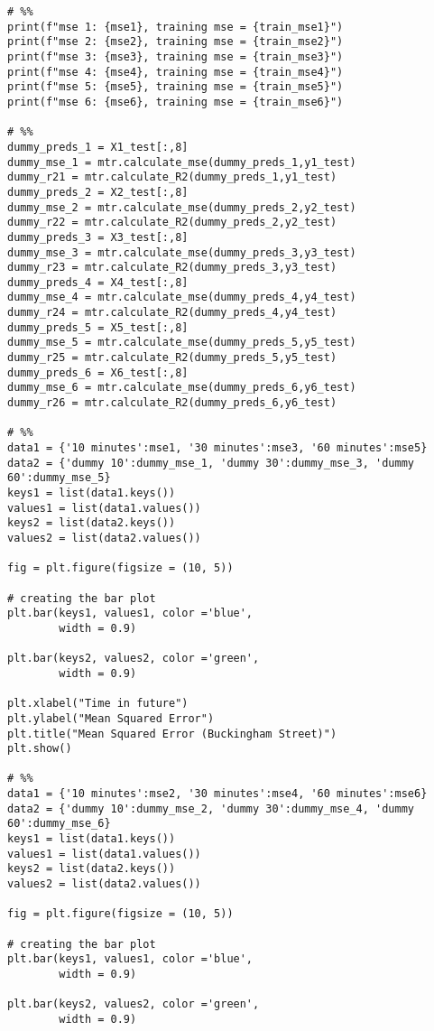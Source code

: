 \begin{verbatim}
# %%
print(f"mse 1: {mse1}, training mse = {train_mse1}")
print(f"mse 2: {mse2}, training mse = {train_mse2}")
print(f"mse 3: {mse3}, training mse = {train_mse3}")
print(f"mse 4: {mse4}, training mse = {train_mse4}")
print(f"mse 5: {mse5}, training mse = {train_mse5}")
print(f"mse 6: {mse6}, training mse = {train_mse6}")

# %%
dummy_preds_1 = X1_test[:,8]
dummy_mse_1 = mtr.calculate_mse(dummy_preds_1,y1_test)
dummy_r21 = mtr.calculate_R2(dummy_preds_1,y1_test)
dummy_preds_2 = X2_test[:,8]
dummy_mse_2 = mtr.calculate_mse(dummy_preds_2,y2_test)
dummy_r22 = mtr.calculate_R2(dummy_preds_2,y2_test)
dummy_preds_3 = X3_test[:,8]
dummy_mse_3 = mtr.calculate_mse(dummy_preds_3,y3_test)
dummy_r23 = mtr.calculate_R2(dummy_preds_3,y3_test)
dummy_preds_4 = X4_test[:,8]
dummy_mse_4 = mtr.calculate_mse(dummy_preds_4,y4_test)
dummy_r24 = mtr.calculate_R2(dummy_preds_4,y4_test)
dummy_preds_5 = X5_test[:,8]
dummy_mse_5 = mtr.calculate_mse(dummy_preds_5,y5_test)
dummy_r25 = mtr.calculate_R2(dummy_preds_5,y5_test)
dummy_preds_6 = X6_test[:,8]
dummy_mse_6 = mtr.calculate_mse(dummy_preds_6,y6_test)
dummy_r26 = mtr.calculate_R2(dummy_preds_6,y6_test)

# %%
data1 = {'10 minutes':mse1, '30 minutes':mse3, '60 minutes':mse5}
data2 = {'dummy 10':dummy_mse_1, 'dummy 30':dummy_mse_3, 'dummy 60':dummy_mse_5}
keys1 = list(data1.keys())
values1 = list(data1.values())
keys2 = list(data2.keys())
values2 = list(data2.values())
  
fig = plt.figure(figsize = (10, 5))
 
# creating the bar plot
plt.bar(keys1, values1, color ='blue',
        width = 0.9)

plt.bar(keys2, values2, color ='green',
        width = 0.9)

plt.xlabel("Time in future")
plt.ylabel("Mean Squared Error")
plt.title("Mean Squared Error (Buckingham Street)")
plt.show()

# %%
data1 = {'10 minutes':mse2, '30 minutes':mse4, '60 minutes':mse6}
data2 = {'dummy 10':dummy_mse_2, 'dummy 30':dummy_mse_4, 'dummy 60':dummy_mse_6}
keys1 = list(data1.keys())
values1 = list(data1.values())
keys2 = list(data2.keys())
values2 = list(data2.values())
  
fig = plt.figure(figsize = (10, 5))
 
# creating the bar plot
plt.bar(keys1, values1, color ='blue',
        width = 0.9)

plt.bar(keys2, values2, color ='green',
        width = 0.9)


\end{verbatim}
